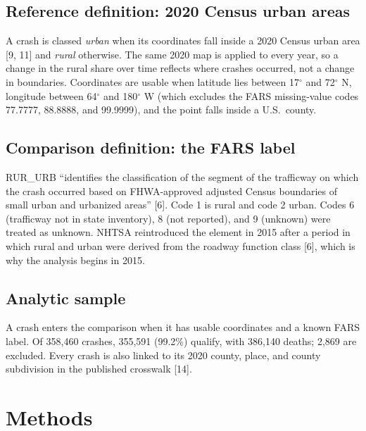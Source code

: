 \documentclass[12pt]{article}
\begin{document}
\subsection{Reference definition: 2020 Census urban areas}

A crash is classed \emph{urban} when its coordinates fall inside a 2020 Census urban area [9, 11] and \emph{rural} otherwise. The same 2020 map is applied to every year, so a change in the rural share over time reflects where crashes occurred, not a change in boundaries. Coordinates are usable when latitude lies between 17$^\circ$ and 72$^\circ$ N, longitude between 64$^\circ$ and 180$^\circ$ W (which excludes the FARS missing-value codes 77.7777, 88.8888, and 99.9999), and the point falls inside a U.S.\ county.

\subsection{Comparison definition: the FARS label}

RUR\_URB ``identifies the classification of the segment of the trafficway on which the crash occurred based on FHWA-approved adjusted Census boundaries of small urban and urbanized areas'' [6]. Code 1 is rural and code 2 urban. Codes 6 (trafficway not in state inventory), 8 (not reported), and 9 (unknown) were treated as unknown. NHTSA reintroduced the element in 2015 after a period in which rural and urban were derived from the roadway function class [6], which is why the analysis begins in 2015.

\subsection{Analytic sample}

A crash enters the comparison when it has usable coordinates and a known FARS label. Of 358{,}460 crashes, 355{,}591 (99.2\%) qualify, with 386{,}140 deaths; 2{,}869 are excluded. Every crash is also linked to its 2020 county, place, and county subdivision in the published crosswalk [14].

\section{Methods}
\end{document}
